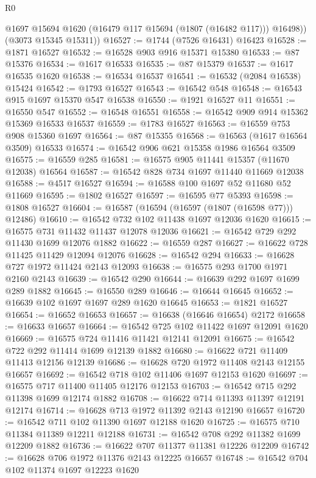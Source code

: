 \begin{lexlean}{R0}
\begin{coremodule}
          @1697
          @15694
          @1620
          (@16479 @117 @15694 (@1807 (@16482 @117)))
          @16498))
      (@3073 @15345 @15311))
@16527 := @1744 (@7526 @16431) @16423
@16528 := @1871 @16527
@16532 := @16528 @903 @916 @15371 @15380
@16533 := @87 @15376
@16534 := @1617 @16533
@16535 := @87 @15379
@16537 := @1617 @16535 @1620
@16538 := @16534 @16537
@16541 := @16532 (@2084 @16538) @15424
@16542 := @1793 @16527
@16543 := @16542 @548
@16548 := @16543 @915 @1697 @15370 @547 @16538
@16550 := @1921 @16527 @11
@16551 := @16550 @547
@16552 := @16548 @16551
@16558 := @16542 @909 @914 @15362 @15369 @16533 @16537
@16559 := @1783 @16527
@16563 := @16559 @753 @908 @15360 @1697
@16564 := @87 @15355
@16568 := @16563 (@1617 @16564 @3509) @16533
@16574 := @16542 @906 @621 @15358 @1986 @16564 @3509
@16575 := @16559 @285
@16581 := @16575 @905 @11441 @15357 (@11670 @12038) @16564
@16587 := @16542 @828 @734 @1697 @11440 @11669 @12038
@16588 := @4517 @16527
@16594 := @16588 @100 @1697 @52 @11680 @52 @11669
@16595 := @1802 @16527
@16597 := @16595 @77 @5393
@16598 := @1808 @16527
@16604 := @16587 (@16594 (@16597 (@1807 (@16598 @77))) @12486)
@16610 := @16542 @732 @102 @11438 @1697 @12036 @1620
@16615 := @16575 @731 @11432 @11437 @12078 @12036
@16621 := @16542 @729 @292 @11430 @1699 @12076 @1882
@16622 := @16559 @287
@16627 := @16622 @728 @11425 @11429 @12094 @12076
@16628 := @16542 @294
@16633 := @16628 @727 @1972 @11424 @2143 @12093
@16638 := @16575 @293 @1700 @1971 @2160 @2143
@16639 := @16542 @290
@16644 := @16639 @292 @1697 @1699 @289 @1882
@16645 := @16550 @289
@16646 := @16644 @16645
@16652 := @16639 @102 @1697 @1697 @289 @1620 @16645
@16653 := @1821 @16527
@16654 := @16652 @16653
@16657 := @16638 (@16646 @16654) @2172
@16658 := @16633 @16657
@16664 := @16542 @725 @102 @11422 @1697 @12091 @1620
@16669 := @16575 @724 @11416 @11421 @12141 @12091
@16675 := @16542 @722 @292 @11414 @1699 @12139 @1882
@16680 := @16622 @721 @11409 @11413 @12156 @12139
@16686 := @16628 @720 @1972 @11408 @2143 @12155 @16657
@16692 := @16542 @718 @102 @11406 @1697 @12153 @1620
@16697 := @16575 @717 @11400 @11405 @12176 @12153
@16703 := @16542 @715 @292 @11398 @1699 @12174 @1882
@16708 := @16622 @714 @11393 @11397 @12191 @12174
@16714 := @16628 @713 @1972 @11392 @2143 @12190 @16657
@16720 := @16542 @711 @102 @11390 @1697 @12188 @1620
@16725 := @16575 @710 @11384 @11389 @12211 @12188
@16731 := @16542 @708 @292 @11382 @1699 @12209 @1882
@16736 := @16622 @707 @11377 @11381 @12226 @12209
@16742 := @16628 @706 @1972 @11376 @2143 @12225 @16657
@16748 := @16542 @704 @102 @11374 @1697 @12223 @1620

\end{coremodule}
\end{lexlean}
